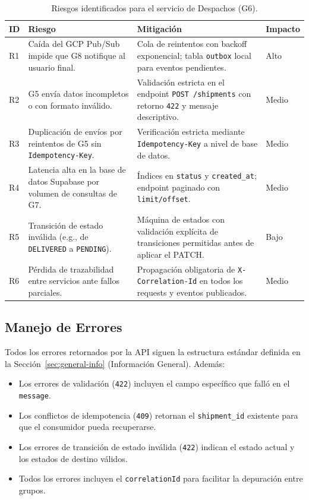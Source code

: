 \documentclass[11pt, a4paper]{article}
\begin{document}
\begin{table}[!ht]
\centering
\renewcommand{\arraystretch}{1.4}
\begin{tabularx}{\textwidth}{l X X l}
  \toprule
  \textbf{ID} & \textbf{Riesgo} & \textbf{Mitigación} & \textbf{Impacto} \\
  \midrule
  R1 & Caída del GCP Pub/Sub impide que G8 notifique al usuario final. & Cola de reintentos con backoff exponencial; tabla \texttt{outbox} local para eventos pendientes. & Alto \\
  R2 & G5 envía datos incompletos o con formato inválido. & Validación estricta en el endpoint \texttt{POST /shipments} con retorno \texttt{422} y mensaje descriptivo. & Medio \\
  R3 & Duplicación de envíos por reintentos de G5 sin \texttt{Idempotency-Key}. & Verificación estricta mediante \texttt{Idempotency-Key} a nivel de base de datos. & Medio \\
  R4 & Latencia alta en la base de datos Supabase por volumen de consultas de G7. & Índices en \texttt{status} y \texttt{created\_at}; endpoint paginado con \texttt{limit/offset}. & Medio \\
  R5 & Transición de estado inválida (e.g., de \texttt{DELIVERED} a \texttt{PENDING}). & Máquina de estados con validación explícita de transiciones permitidas antes de aplicar el PATCH. & Bajo \\
  R6 & Pérdida de trazabilidad entre servicios ante fallos parciales. & Propagación obligatoria de \texttt{X-Correlation-Id} en todos los requests y eventos publicados. & Medio \\
  \bottomrule
\end{tabularx}
\caption{Riesgos identificados para el servicio de Despachos (G6).}
\end{table}

\subsection{Manejo de Errores}

Todos los errores retornados por la API siguen la estructura estándar definida en la Sección~\ref{sec:general-info} (Información General). Además:

\begin{itemize}[noitemsep]
  \item Los errores de validación (\texttt{422}) incluyen el campo específico que falló en el \texttt{message}.
  \item Los conflictos de idempotencia (\texttt{409}) retornan el \texttt{shipment\_id} existente para que el consumidor pueda recuperarse.
  \item Los errores de transición de estado inválida (\texttt{422}) indican el estado actual y los estados de destino válidos.
  \item Todos los errores incluyen el \texttt{correlationId} para facilitar la depuración entre grupos.
\end{itemize}
\end{document}
